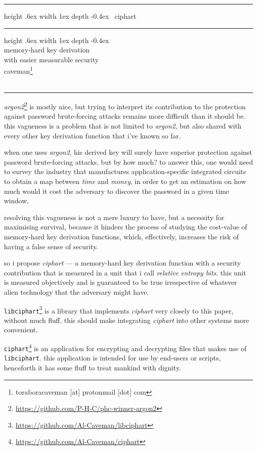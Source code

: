 \documentclass[twocolumn]{article}
\makeatletter
\def\myrulefill{%
    \leavevmode\leaders\hrule%
    height .6ex width 1ex depth -0.4ex%
    \hfill\kern\z@%
}
\makeatother
\begin{document}

\begin{center}
\Huge
\myrulefill\ ciphart \myrulefill\\
\LARGE
memory-hard key derivation \\
with easier measurable security\\
\normalsize
caveman\footnote{toraboracaveman [at] protonmail [dot] com}\\
\footnotesize
\DTMnow\\
\rule{1\columnwidth}{2pt}
\end{center}

\emph{argon2}\footnote{\url{https://github.com/P-H-C/phc-winner-argon2}} is
mostly nice, but trying to interpret its contribution to the protection
against password brute-forcing attacks remains more difficult than it
should be.  this vagueness is a problem that is not limited to
\emph{argon2}, but also shared with every other key derivation function
that i've known so far.

when one uses \emph{argon2}, his derived key will surely have superior
protection against password brute-forcing attacks, but by how much?  to
answer this, one would need to survey the industry that manufactures
application-specific integrated circuits to obtain a map between
\emph{time} and \emph{money}, in order to get an estimation on how much
would it cost the adversary to discover the password in a given time
window.

resolving this vagueness is not a mere luxury to have, but a necessity for
maximising survival, because it hinders the process of studying the
cost-value of memory-hard key derivation functions, which, effectively,
increases the risk of having a false sense of security.

so i propose \emph{ciphart} --- a memory-hard key derivation function with
a security contribution that is measured in a unit that i call
\emph{relative entropy bits}.  this unit is measured objectively and is
guaranteed to be true irrespective of whatever alien technology that the
adversary might have.

\texttt{libciphart}\footnote{\url{https://github.com/Al-Caveman/libciphart}}
is a library that implements \emph{ciphart} very closely to this paper,
without much fluff.  this should make integrating \emph{ciphart} into other
systems more convenient.

\texttt{ciphart}\footnote{\url{https://github.com/Al-Caveman/ciphart}} is
an application for encrypting and decrypting files that makes use of
\texttt{libciphart}.  this application is intended for use by end-users or
scripts, henceforth it has some fluff to treat mankind with dignity.
\end{document}
